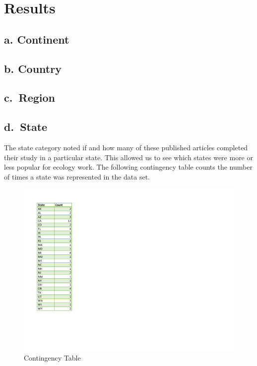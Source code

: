 \documentclass[
]{article}
\begin{document}
\hypertarget{results}{%
\section{Results}\label{results}}

\hypertarget{a.-continent}{%
\subsection{a. Continent}\label{a.-continent}}

\hypertarget{b.-country}{%
\subsection{b. Country}\label{b.-country}}

\hypertarget{c.-region}{%
\subsection{c.~Region}\label{c.-region}}

\hypertarget{d.-state}{%
\subsection{d.~State}\label{d.-state}}

The state category noted if and how many of these published articles
completed their study in a particular state. This allowed us to see
which states were more or less popular for ecology work. The following
contingency table counts the number of times a state was represented in
the data set.

\begin{figure}
  \caption{Contingency Table}
    \includegraphics[width=13cm]{statetable.pdf}
\end{figure}
\end{document}
